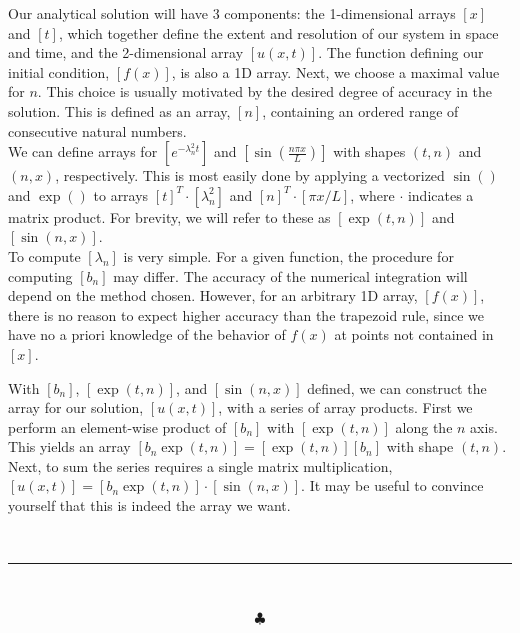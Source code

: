 \documentclass[]{article}
\begin{document}
Our analytical solution will have 3 components: the 1-dimensional arrays $[x]$ and $[t]$, which together define the extent and resolution of our system in space and time, and the 2-dimensional array $[u(x,t)]$. The function defining our initial condition, $[f(x)]$, is also a 1D array. Next, we choose a maximal value for $n$. This choice is usually motivated by the desired degree of accuracy in the solution. This is defined as an array, $[n]$, containing an ordered range of consecutive natural numbers. \\

We can define arrays for $[e^{- \lambda_n^2 t}]$ and $[\sin( \frac{ n \pi x}{ L } )]$ with shapes $(t, n)$ and $(n, x)$, respectively. This is most easily done by applying a vectorized $\sin()$ and $\exp()$ to arrays $[t]^T \cdot [\lambda_n^2] $ and $[n]^T \cdot [\pi x /L]$, where $\cdot$ indicates a matrix product. For brevity, we will refer to these as $[\exp(t,n)] $ and $[\sin(n,x)]$. \\

To compute $[\lambda_n]$ is very simple. For a given function, the procedure for computing $[b_n]$ may differ. The accuracy of the numerical integration will depend on the method chosen. However, for an arbitrary 1D array, $[f(x)]$, there is no reason to expect higher accuracy than the trapezoid rule, since we have no a priori knowledge of the behavior of $f(x)$ at points not contained in $[x]$. 

With $[b_n]$, $[\exp(t,n)] $, and $[\sin(n,x)]$ defined, we can construct the array for our solution, $[u(x,t)]$, with a series of array products. First we perform an element-wise product of $[b_n]$ with $[\exp(t,n)]$ along the $n$ axis. This yields an array $[b_n \exp(t,n)] = [\exp(t,n)][b_n]$ with shape $(t,n)$. Next, to sum the series requires a single matrix multiplication, $[u(x,t)] = [b_n \exp(t,n)] \cdot [\sin(n,x)]$. It may be useful to convince yourself that this is indeed the array we want.



\hfill \\



\begin{center}
\noindent\rule{15cm}{0.4pt} \\
\end{center}
$$\clubsuit$$
\end{document}
